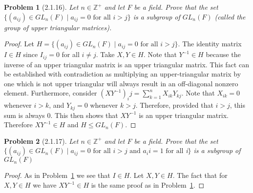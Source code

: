 \documentclass{article}
\newtheorem{problem}{Problem}
\begin{document}
\begin{problem}[2.1.16]
\label{uppertri}
Let $n \in \mathbb{Z}^+$ and let $F$ be a field. Prove that the set $\{(a_{ij}) \in GL_n(F) \mid a_{ij} = 0 \text{ for all } i > j\}$ is a subgroup of $GL_n(F)$ (called the group of upper triangular matrices).
\end{problem}
\begin{proof}
Let $H = \{(a_{ij}) \in GL_n(F) \mid a_{ij} = 0 \text{ for all } i > j\}$. The identity matrix $I \in H$ since $I_{ij} = 0$ for all $i \neq j$. Take $X,Y \in H$. Note that $Y^{-1} \in H$ because the inverse of an upper triangular matrix is an upper triangular matrix. This fact can be established with contradiction as multiplying an upper-triangular matrix by one which is not upper triangular will always result in an off-diagonal nonzero element. Furthermore, consider $(XY^{-1})_ij = \sum_{k = 1}^{n} X_{ik}Y_{kj}$. Note that $X_{ik} = 0$ whenever $i > k$, and $Y_{kj} = 0$ whenever $k > j$. Therefore, provided that $i > j$, this sum is always $0$. This then shows that $XY^{-1}$ is an upper triangular matrix. Therefore $XY^{-1} \in H$ and $H \leq GL_n(F)$.
\end{proof}

\begin{problem}[2.1.17]
Let $n \in \mathbb{Z}^+$ and let $F$ be a field. Prove that the set $\{(a_{ij}) \in GL_n(F) \mid a_{ij} = 0 \text{ for all } i > j \text{ and } a_ii = 1 \text{ for all } $i$\}$ is a subgroup of $GL_n(F)$
\end{problem}
\begin{proof}
As in Problem~\ref{uppertri} we see that $I \in H$. Let $X, Y \in H$. The fact that for $X,Y \in H$ we have $XY^{-1} \in H$ is the same proof as in Problem~\ref{uppertri}.
\end{proof}
\end{document}

